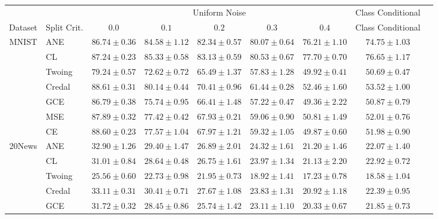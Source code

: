\documentclass[letterpaper]{article} %
\begin{document}
\begin{table}[t]
	\scriptsize
	\centering
	\begin{tabular}{clccccccc}
&& \multicolumn{5}{c}{Uniform Noise} & Class Conditional \\ \cline{3-8}
Dataset & Split Crit. & $0.0$ & $0.1$ & $0.2$ & $0.3$ & $0.4$ & Class Conditional  \\ \hline
\multirow{7}{*}{MNIST}
 & ANE    & $86.74 \pm 0.36$ & $\mathbf{84.58 \pm 1.12}$ & $\mathbf{82.34 \pm 0.57}$ & $\mathbf{80.07 \pm 0.64}$ & $76.21 \pm 1.10$ & $74.75 \pm 1.03$ \\
 & CL     & $87.24 \pm 0.23$ & $\mathbf{85.33 \pm 0.58}$ & $\mathbf{83.13 \pm 0.59}$ & $\mathbf{80.53 \pm 0.67}$ & $\mathbf{77.70 \pm 0.70}$ & $\mathbf{76.65 \pm 1.17}$ \\
 & Twoing & $79.24 \pm 0.57$ & $72.62 \pm 0.72$ & $65.49 \pm 1.37$ & $57.83 \pm 1.28$ & $49.92 \pm 0.41$ & $50.69 \pm 0.47$ \\
 & Credal & $\mathbf{88.61 \pm 0.31}$ & $80.14 \pm 0.44$ & $70.41 \pm 0.96$ & $61.44 \pm 0.28$ & $52.46 \pm 1.60$ & $53.52 \pm 1.00$ \\
 & GCE    & $86.79 \pm 0.38$ & $75.74 \pm 0.95$ & $66.41 \pm 1.48$ & $57.22 \pm 0.47$ & $49.36 \pm 2.22$ & $50.87 \pm 0.79$ \\
 & MSE    & $87.89 \pm 0.32$ & $77.42 \pm 0.42$ & $67.93 \pm 0.21$ & $59.06 \pm 0.90$ & $50.81 \pm 1.49$ & $52.01 \pm 0.76$ \\
 & CE     & $\mathbf{88.60 \pm 0.23}$ & $77.57 \pm 1.04$ & $67.97 \pm 1.21$ & $59.32 \pm 1.05$ & $49.87 \pm 0.60$ & $51.98 \pm 0.90$ \\
\hline
\multirow{7}{*}{20News}
 & ANE    & $\mathbf{32.90 \pm 1.26}$ & $\mathbf{29.40 \pm 1.47}$ & $\mathbf{26.89 \pm 2.01}$ & $\mathbf{24.32 \pm 1.61}$ & $\mathbf{21.20 \pm 1.46}$ & $\mathbf{22.07 \pm 1.40}$ \\
 & CL     & $31.01 \pm 0.84$ & $28.64 \pm 0.48$ & $\mathbf{26.75 \pm 1.61}$ & $\mathbf{23.97 \pm 1.34}$ & $\mathbf{21.13 \pm 2.20}$ & $\mathbf{22.92 \pm 0.72}$ \\
 & Twoing & $25.56 \pm 0.60$ & $22.73 \pm 0.98$ & $21.95 \pm 0.73$ & $18.92 \pm 1.41$ & $17.23 \pm 0.78$ & $18.58 \pm 1.04$ \\
 & Credal & $33.11 \pm 0.31$ & $\mathbf{30.41 \pm 0.71}$ & $\mathbf{27.67 \pm 1.08}$ & $\mathbf{23.83 \pm 1.31}$ & $\mathbf{20.92 \pm 1.18}$ & $\mathbf{22.39 \pm 0.95}$ \\
 & GCE    & $31.72 \pm 0.32$ & $28.45 \pm 0.86$ & $\mathbf{25.74 \pm 1.42}$ & $\mathbf{23.11 \pm 1.10}$ & $\mathbf{20.33 \pm 0.67}$ & $\mathbf{21.85 \pm 0.73}$ \\

\end{tabular}
\end{table}
\end{document}
